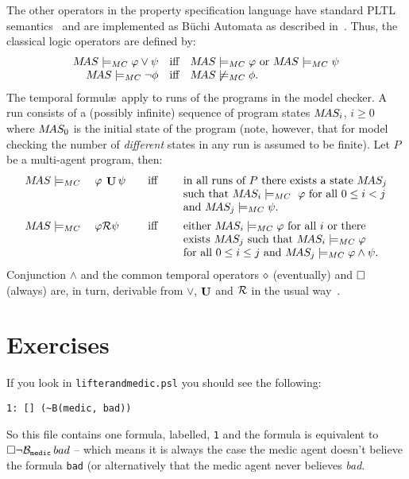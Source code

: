\noindent The other operators in the \ajpf{} property specification
language have standard PLTL semantics~\cite{emerson:90a} and are
implemented as B\"{u}chi Automata as described
in~\cite{Gerth:1995:SOA:645837.670574,Courcoubetis92mea}. Thus, the
classical logic operators are defined by:
$$
\begin{array}{rcl}
  M\!AS \models_{MC} \varphi \vee \psi &\text{iff}& M\!AS \models_{MC}
  \varphi \text{ or } M\!AS \models_{MC} \psi \\
  M\!AS \models_{MC} \neg \phi &\text{iff}& M\!AS \not\models_{MC} \phi.
\end{array}
$$
The temporal formul\ae\ apply to runs of the programs in the \jpf{}
model checker. A run consists of a (possibly infinite) sequence of
program states $M\!AS_i$, $i \geq 0$ where $M\!AS_0$ is the initial
state of the program (note, however, that for model checking the
number of \emph{different} states in any run is assumed to be
finite). Let $P$ be a multi-agent program, then:
$$
\begin{array}{lcl}
  \MAS \models_{MC}\quad \varphi \: \luntil \psi 
   &\quad\text{iff}\quad&
    \text{ in all runs of $P$ there exists a state } \MAS_j\\
  &&  \text{ such that } \MAS_i \models_{MC}\ \varphi \text{ for all } 0 \leq i < j \\
  && \text{ and } \MAS_j \models_{MC} \psi{}.\\[.5em]
%
  \MAS \models_{MC}\quad\varphi \release \psi  
   &\quad\text{iff}\quad&
    \text{ either } \MAS_i \models_{MC} \varphi \text{ for all } i \text{ or there }\\
  && \text{ exists } \MAS_j \text{ such  that } \MAS_i \models_{MC} \varphi\\
  && \text{ for all } 0 \leq i \leq j \text{ and } \MAS_j \models_{MC} \varphi \land \psi{}.
\end{array}
$$
%
Conjunction $\land$ and the common temporal operators $\diamond$ (eventually) and $\Box$
(always) are, in turn, derivable from $\vee$, $\mathop{\mathrm{\mathbf{U}}}$ and $\mathcal{R}$ in the
usual way~\cite{emerson:90a}.

\section{Exercises}
If you look in \texttt{lifterandmedic.psl} you should see the following:
\begin{verbatim}
1: [] (~B(medic, bad))
\end{verbatim}
So this file contains one formula, labelled, \texttt{1} and the formula is equivalent to $\Box \neg \mathrm{{\cal B}}_{\texttt{medic}} \, bad$ -- which means it is always the case the medic agent doesn't believe the formula \texttt{bad} (or alternatively that the medic agent never believes \emph{bad}.

